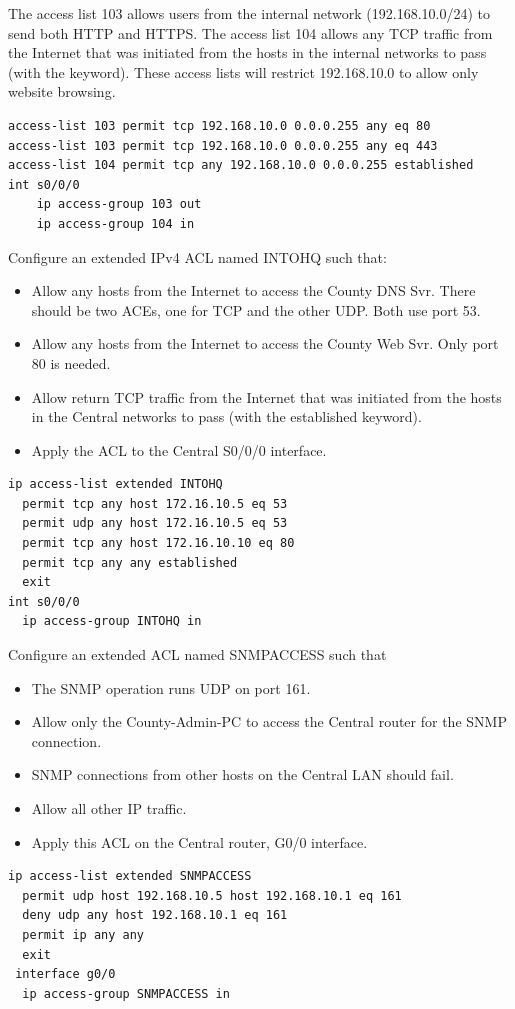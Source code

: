 \begin{example}
The access list 103 allows users from the  internal network (192.168.10.0/24) to send both HTTP and HTTPS. The access list 104 allows any TCP traffic from the Internet that was initiated from the hosts in the internal networks to pass (with the  keyword). These access lists will restrict 192.168.10.0 to allow only website browsing.
\begin{verbatim}
access-list 103 permit tcp 192.168.10.0 0.0.0.255 any eq 80
access-list 103 permit tcp 192.168.10.0 0.0.0.255 any eq 443
access-list 104 permit tcp any 192.168.10.0 0.0.0.255 established
int s0/0/0
	ip access-group 103 out
	ip access-group 104 in
\end{verbatim}
\end{example}

\begin{example}
Configure an extended IPv4 ACL named INTOHQ such that: 
\begin{itemize}
\item Allow any hosts from the Internet to access the County DNS Svr. There should be two ACEs, one for TCP and the other UDP. Both use port 53.
\item Allow any hosts from the Internet to access the County Web Svr. Only port 80 is needed.
\item Allow return TCP traffic from the Internet that was initiated from the hosts in the Central networks to pass (with the established keyword).
\item Apply the ACL to the Central S0/0/0 interface.
\end{itemize}
\begin{verbatim}
ip access-list extended INTOHQ
  permit tcp any host 172.16.10.5 eq 53
  permit udp any host 172.16.10.5 eq 53
  permit tcp any host 172.16.10.10 eq 80
  permit tcp any any established
  exit
int s0/0/0
  ip access-group INTOHQ in
\end{verbatim}
\end{example}

\begin{example}
Configure an extended ACL named SNMPACCESS such that 
\begin{itemize}
\item The SNMP operation runs UDP on port 161.
\item Allow only the County-Admin-PC to access the Central router for the SNMP connection.
\item SNMP connections from other hosts on the Central LAN should fail.
\item Allow all other IP traffic.
\item Apply this ACL on the Central router, G0/0 interface.
\end{itemize}
\begin{verbatim}
ip access-list extended SNMPACCESS
  permit udp host 192.168.10.5 host 192.168.10.1 eq 161
  deny udp any host 192.168.10.1 eq 161
  permit ip any any
  exit
 interface g0/0
  ip access-group SNMPACCESS in
\end{verbatim}
\end{example}

